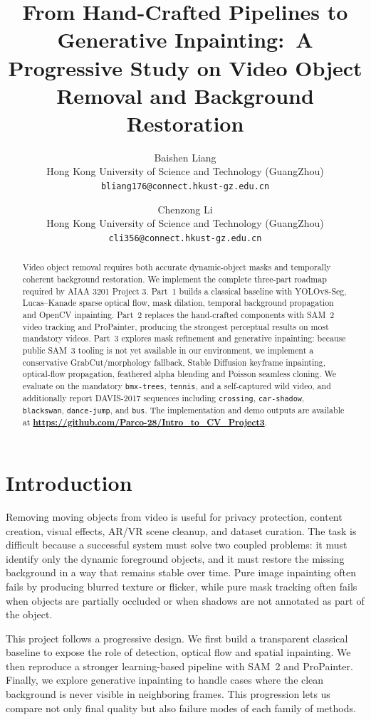 \documentclass[10pt,twocolumn,letterpaper]{article}
\title{From Hand-Crafted Pipelines to Generative Inpainting:\
A Progressive Study on Video Object Removal and Background Restoration}
\author{Baishen Liang\\
Hong Kong University of Science and Technology (GuangZhou)\\
{\tt\small bliang176@connect.hkust-gz.edu.cn}
\and
Chenzong Li\\
Hong Kong University of Science and Technology (GuangZhou)\\
{\tt\small cli356@connect.hkust-gz.edu.cn}
}
\begin{document}
\maketitle

\begin{abstract}
Video object removal requires both accurate dynamic-object masks and temporally coherent background restoration. We implement the complete three-part roadmap required by AIAA 3201 Project 3. Part~1 builds a classical baseline with YOLOv8-Seg, Lucas--Kanade sparse optical flow, mask dilation, temporal background propagation and OpenCV inpainting. Part~2 replaces the hand-crafted components with SAM~2 video tracking and ProPainter, producing the strongest perceptual results on most mandatory videos. Part~3 explores mask refinement and generative inpainting: because public SAM~3 tooling is not yet available in our environment, we implement a conservative GrabCut/morphology fallback, Stable Diffusion keyframe inpainting, optical-flow propagation, feathered alpha blending and Poisson seamless cloning. We evaluate on the mandatory \texttt{bmx-trees}, \texttt{tennis}, and a self-captured wild video, and additionally report DAVIS-2017 sequences including \texttt{crossing}, \texttt{car-shadow}, \texttt{blackswan}, \texttt{dance-jump}, and \texttt{bus}. The implementation and demo outputs are available at \textbf{\url{https://github.com/Parco-28/Intro_to_CV_Project3}}.
\end{abstract}

\section{Introduction}
\label{sec:intro}
Removing moving objects from video is useful for privacy protection, content creation, visual effects, AR/VR scene cleanup, and dataset curation. The task is difficult because a successful system must solve two coupled problems: it must identify only the dynamic foreground objects, and it must restore the missing background in a way that remains stable over time. Pure image inpainting often fails by producing blurred texture or flicker, while pure mask tracking often fails when objects are partially occluded or when shadows are not annotated as part of the object.

This project follows a progressive design. We first build a transparent classical baseline to expose the role of detection, optical flow and spatial inpainting. We then reproduce a stronger learning-based pipeline with SAM~2 and ProPainter. Finally, we explore generative inpainting to handle cases where the clean background is never visible in neighboring frames. This progression lets us compare not only final quality but also failure modes of each family of methods.
\end{document}

